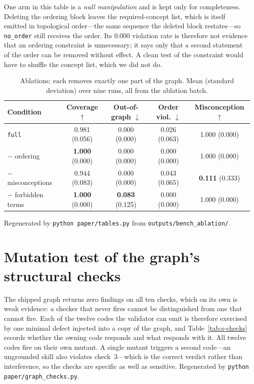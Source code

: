 \documentclass[11pt,a4paper]{article}
\newcommand{\id}[1]{\texttt{#1}}
\begin{document}
One arm in this table is a \emph{null manipulation} and is kept only for
completeness. Deleting the ordering block leaves the required-concept list, which
is itself emitted in topological order---the same sequence the deleted block
restates---so \id{no\_order} still receives the order. Its 0.000 violation rate is
therefore not evidence that an ordering constraint is unnecessary; it says only
that a second statement of the order can be removed without effect. A clean test
of the constraint would have to shuffle the concept list, which we did not do.

\begin{table}[htbp]
\centering
\caption{Ablations; each removes exactly one part of the graph. Mean (standard
deviation) over nine runs, all from the ablation batch.}
\label{tab:s-ablation}
\footnotesize
\setlength{\tabcolsep}{5pt}
\begin{tabularx}{\textwidth}{@{}L{3.2cm}cccc@{}}
\toprule
Condition & Coverage $\uparrow$ & Out-of-graph $\downarrow$ & Order viol. $\downarrow$
& Misconception $\uparrow$ \\
\midrule
\id{full} & 0.981 (0.056) & 0.000 (0.000) & 0.026 (0.063) & 1.000 (0.000) \\
$-$ ordering & \textbf{1.000} (0.000) & 0.000 (0.000) & 0.000 (0.000) & 1.000 (0.000) \\
$-$ misconceptions & 0.944 (0.083) & 0.000 (0.000) & 0.043 (0.065)
& \textbf{0.111} (0.333) \\
$-$ forbidden terms & \textbf{1.000} (0.000) & \textbf{0.083} (0.125) & 0.000 (0.000)
& 1.000 (0.000) \\
\bottomrule
\end{tabularx}
\end{table}

Regenerated by \id{python paper/tables.py} from \id{outputs/bench\_ablation/}.

\section{Mutation test of the graph's structural checks}
\label{sec:s2}

The shipped graph returns zero findings on all ten checks, which on its own is
weak evidence: a checker that never fires cannot be distinguished from one that
cannot fire. Each of the twelve codes the validator can emit is therefore
exercised by one minimal defect injected into a copy of the graph, and
Table~\ref{tab:s-checks} records whether the owning code responds and what
responds with it. All twelve codes fire on their own mutant. A single mutant
triggers a second code---an ungrounded skill also violates check~3---which is the
correct verdict rather than interference, so the checks are specific as well as
sensitive. Regenerated by \id{python paper/graph\_checks.py}.
\end{document}
